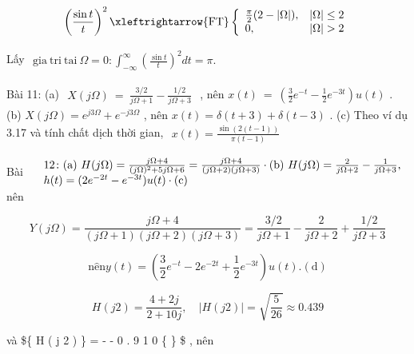 \documentclass[
  10
]{article}
\begin{document}
\[
\left(\frac {\sin t}{t}\right) ^ {2} \xleftrightarrow {\text {FT}} \left\{ \begin{array}{l l} \frac {\pi}{2} (2 - | \Omega |), & | \Omega | \leq 2 \\ 0, & | \Omega | > 2 \end{array} \right.
\]

Lấy
\(\begin{array} { r } { \mathrm { g i a ~ t r i ~ t a i ~ } \Omega = 0 \colon \int _ { - \infty } ^ { \infty } \left( \frac { \sin t } { t } \right) ^ { 2 } d t = \pi . } \end{array}\)

Bài 11: (a)
\(\begin{array} { r } { X ( j \Omega ) ~ = ~ \frac { 3 / 2 } { j \Omega + 1 } - \frac { 1 / 2 } { j \Omega + 3 } } \end{array}\)
, nên
\(x ( t ) ~ = ~ \left( { \textstyle { \frac { 3 } { 2 } } } e ^ { - t } - { \textstyle { \frac { 1 } { 2 } } } e ^ { - 3 t } \right) u ( t )\)
. (b) \(X ( j \Omega ) = e ^ { j 3 \Omega } + e ^ { - j 3 \Omega }\) ,
nên \(x ( t ) = \delta ( t + 3 ) + \delta ( t - 3 )\) . (c) Theo ví dụ
3.17 và tính chất dịch thời gian,
\(\begin{array} { r } { x ( t ) = \frac { \sin \left( 2 \left( t - 1 \right) \right) } { \pi \left( t - 1 \right) } } \end{array}\)

Bài
\(\begin{array} { r l } & { 1 2 \colon \mathrm { ( a ) } \ H ( j \Omega ) = \frac { j \Omega + 4 } { ( j \Omega ) ^ { 2 } + 5 j \Omega + 6 } = \frac { j \Omega + 4 } { ( j \Omega + 2 ) ( j \Omega + 3 ) } \cdot \mathrm { ( b ) } \ H ( j \Omega ) = \frac { 2 } { j \Omega + 2 } - \frac { 1 } { j \Omega + 3 } , } \\ & { h ( t ) = ( 2 e ^ { - 2 t } - e ^ { - 3 t } ) u ( t ) \cdot \mathrm { ( c ) } } \end{array}\)
nên

\[
Y (j \Omega) = \frac {j \Omega + 4}{(j \Omega + 1) (j \Omega + 2) (j \Omega + 3)} = \frac {3 / 2}{j \Omega + 1} - \frac {2}{j \Omega + 2} + \frac {1 / 2}{j \Omega + 3}
\]

\[
\mathrm {n \hat {e} n} y (t) = \left(\frac {3}{2} e ^ {- t} - 2 e ^ {- 2 t} + \frac {1}{2} e ^ {- 3 t}\right) u (t). (\mathrm{d})
\]

\[
H (j 2) = \frac {4 + 2 j}{2 + 1 0 j}, \quad | H (j 2) | = \sqrt {\frac {5}{2 6}} \approx 0. 4 3 9
\]

và \$\arg \{ H ( j 2 ) \} = 
-  \approx - 0 . 9 1 0 \{  \} \$ , nên
\end{document}

